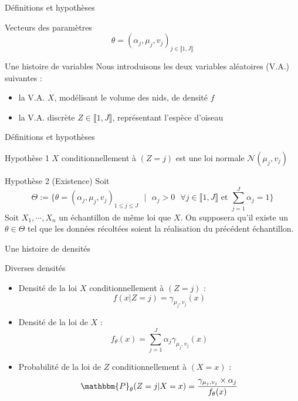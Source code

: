 \documentclass[11pt]{beamer}
\begin{document}
	\begin{frame}{Définitions et hypothèses}
		\begin{block}{Vecteurs des paramètres}
			\[
			\theta = (\alpha_j, \mu_j, v_j)_{j \in \llbracket 1,J\rrbracket}
			\]
		\end{block}
		
		\begin{block}{Une histoire de variables}
			Nous introduisons les deux variables aléatoires (V.A.) suivantes :
			\begin{itemize}
				\item la V.A. $X$, modélisant le volume des nids, de densité $f$
				\item la V.A. discrète $Z \in \llbracket 1,J\rrbracket$, représentant l'espèce d'oiseau
			\end{itemize}
		\end{block}


	\end{frame}


	\begin{frame}{Définitions et hypothèses}
		\begin{block}{Hypothèse 1}
			$X$ conditionnellement à $(Z = j)$ est une loi normale $\mathcal{N}(\mu_j, v_j)$
		\end{block}
		\begin{block}{Hypothèse 2 (Existence)}
			Soit \[
			\Theta := \{ \theta = (\alpha_j,\mu_j, v_j)_{1 \leq j \leq J} \text{ } \big| \text{ } \alpha_j > 0 \text{ } \forall j\in \llbracket 1,J\rrbracket \text{ et } \displaystyle\sum_{j=1}^J\alpha_j=1\}
				 \]
Soit $X_1, \cdots, X_n$ un échantillon de même loi que $X$. \newline
On supposera qu'il existe un $\theta \in \Theta$ tel que les données récoltées soient la réalisation du précédent échantillon.
		\end{block}
	\end{frame}

	\begin{frame}{Une histoire de densités}
		\begin{block}{Diverses densités}
			\begin{itemize}
				\item Densité de la loi $X$ conditionnellement à $(Z=j)$ :
				\[
				f(x| Z = j)  = \gamma_{\mu_j, v_j}(x)
				\]
				\item Densité de la loi de $X$ :
					\[
					f_\theta(x) = \displaystyle\sum_{j=1}^J \alpha_j \gamma_{\mu_j, v_j}(x)
					\]
				\item Probabilité de la loi de $Z$ conditionnellement à $(X = x)$ : 
					\[
					\mathbbm{P}_\theta(Z = j | X = x)=\displaystyle \frac{\gamma_{\mu_j, v_j}\times\alpha_j}{f_\theta(x)}
					\]
			\end{itemize}
		\end{block}
	\end{frame}
\end{document}
